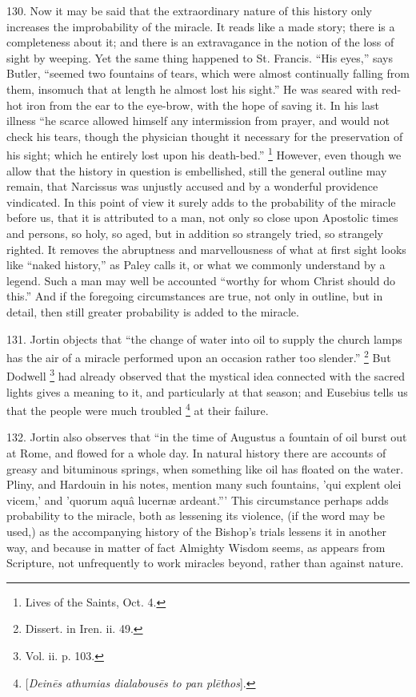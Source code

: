 130.
Now it may be said that the extraordinary nature of this history only
increases the improbability of the miracle. It reads like a made
story; there is a completeness about it; and there is an extravagance
in the notion of the loss of sight by weeping. Yet the same thing
happened to St. Francis. ``His eyes,'' says Butler, ``seemed two
fountains of tears, which were almost continually falling from them,
insomuch that at length he almost lost his sight.'' He was seared with
red-hot iron from the ear to the eye-brow, with the hope of
saving it. In his last illness ``he scarce allowed himself any
intermission from prayer, and would not check his tears, though the
physician thought it necessary for the preservation of his sight;
which he entirely lost upon his death-bed.'' \footnote{Lives of the Saints, Oct. 4.} However, even though we allow that the history in question is
embellished, still the general outline may remain, that Narcissus was
unjustly accused and by a wonderful providence vindicated. In this
point of view it surely adds to the probability of the miracle before
us, that it is attributed to a man, not only so close upon Apostolic
times and persons, so holy, so aged, but in addition so strangely
tried, so strangely righted. It removes the abruptness and
marvellousness of what at first sight looks like ``naked history,'' as
Paley calls it, or what we commonly understand by a legend. Such a man
may well be accounted ``worthy for whom Christ should do this.'' And if
the foregoing circumstances are true, not only in outline, but in
detail, then still greater probability is added to the miracle.

131.
Jortin objects that ``the change of water into oil to supply the church
lamps has the air of a miracle performed upon an occasion rather too
slender.'' \footnote{Dissert. in Iren. ii. 49.} But Dodwell \footnote{Vol. ii. p. 103.} had already observed that the mystical idea connected with the
sacred lights gives a meaning to it, and particularly at that
season; and Eusebius tells us that the people were much troubled \footnote{[\emph{Dein\={e}s athumias dialabous\={e}s to pan pl\={e}thos}].} at their failure.

132.
Jortin also observes that ``in the time of Augustus a fountain of oil
burst out at Rome, and flowed for a whole day. In natural history
there are accounts of greasy and bituminous springs, when something
like oil has floated on the water. Pliny, and Hardouin in his notes,
mention many such fountains, 'qui explent olei vicem,' and 'quorum aquâ
lucernæ ardeant.''' This circumstance perhaps adds probability to the
miracle, both as lessening its violence, (if the word may be used,) as
the accompanying history of the Bishop's trials lessens it in another
way, and because in matter of fact Almighty Wisdom seems, as appears
from Scripture, not unfrequently to work miracles beyond, rather than
against nature.

